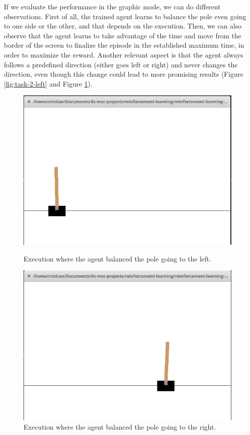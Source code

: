 \documentclass[12pt]{article}
\begin{document}
If we evaluate the performance in the graphic mode, we can do different observations. First of all, the trained agent learns to balance the pole even going to one side or the other, and that depends on the execution. Then, we can also observe that the agent learns to take advantage of the time and move from the border of the screen to finalize the episode in the established maximum time, in order to maximize the reward. Another relevant aspect is that the agent always follows a predefined direction (either goes left or right) and never changes the direction, even though this change could lead to more promising results (Figure \ref{fig:task-2-left} and Figure \ref{fig:task-2-right}).

\begin{figure}[ht]
    \centering
   \begin{minipage}{0.48\textwidth}
     \centering
     \includegraphics[width=0.7\linewidth]{exercise-1/report/img/task-2-left.png}
     \caption{Execution where the agent balanced the pole going to the left.}
     \label{fig:task-2-left}
   \end{minipage}\hfill
   \begin{minipage}{0.48\textwidth}
     \centering
     \includegraphics[width=0.7\linewidth]{exercise-1/report/img/task-2-right.png}
     \caption{Execution where the agent balanced the pole going to the right.}
     \label{fig:task-2-right}
   \end{minipage}
\end{figure}
\end{document}
